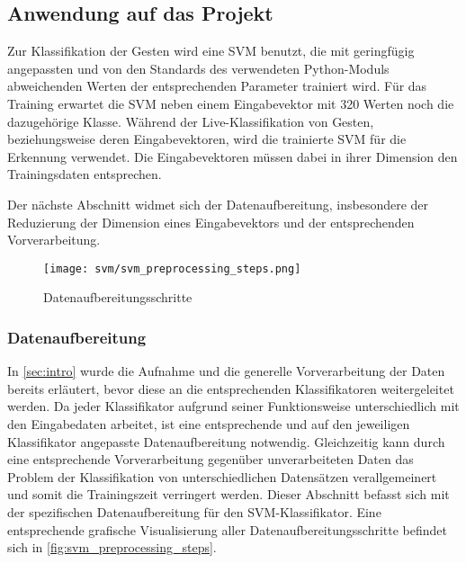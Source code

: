 
\subsection{Anwendung auf das Projekt}
Zur Klassifikation der Gesten wird eine \ac{SVM} benutzt, die mit geringfügig angepassten und von den Standards des verwendeten Python-Moduls abweichenden Werten der entsprechenden Parameter trainiert wird. 
Für das Training erwartet die \ac{SVM} neben einem Eingabevektor mit 320 Werten noch die dazugehörige Klasse.
Während der Live-Klassifikation von Gesten, beziehungsweise deren Eingabevektoren, wird die trainierte \ac{SVM} für die Erkennung verwendet.
Die Eingabevektoren müssen dabei in ihrer Dimension den Trainingsdaten entsprechen.

Der nächste Abschnitt widmet sich der Datenaufbereitung, insbesondere der Reduzierung der Dimension eines Eingabevektors und der entsprechenden Vorverarbeitung.

\begin{figure*}[htbp] \centering
    \texttt{[image: svm/svm\_preprocessing\_steps.png]}
    \caption{Datenaufbereitungsschritte}
    \label{fig:svm_preprocessing_steps}
\end{figure*}

\subsubsection{Datenaufbereitung}\label{sec:svm_data} 
In \autoref{sec:intro} wurde die Aufnahme und die generelle Vorverarbeitung der Daten bereits erläutert, bevor diese an die entsprechenden Klassifikatoren weitergeleitet werden.
Da jeder Klassifikator aufgrund seiner Funktionsweise unterschiedlich mit den Eingabedaten arbeitet, ist eine entsprechende und auf den jeweiligen Klassifikator angepasste Datenaufbereitung notwendig.
Gleichzeitig kann durch eine entsprechende Vorverarbeitung gegenüber unverarbeiteten Daten das Problem der Klassifikation von unterschiedlichen Datensätzen verallgemeinert und somit die Trainingszeit verringert werden.
Dieser Abschnitt befasst sich mit der spezifischen Datenaufbereitung für den \ac{SVM}-Klassifikator. 
Eine entsprechende grafische Visualisierung aller Datenaufbereitungsschritte befindet sich in \autoref{fig:svm_preprocessing_steps}.

